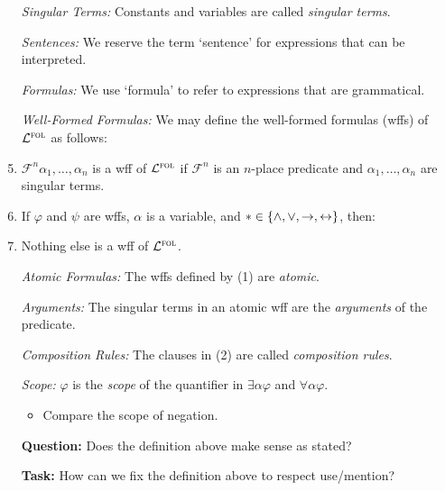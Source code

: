 \documentclass[a4paper, 11pt]{article} %
\begin{document}
\begin{enumerate}
  \item[\it Singular Terms:] Constants and variables are called \textit{singular terms}.
  \item[\it Sentences:] We reserve the term `sentence' for expressions that can be interpreted.
  \item[\it Formulas:] We use `formula' to refer to expressions that are grammatical.
  \item[\it Well-Formed Formulas:] We may define the well-formed formulas (wffs) of $\mathcal{L}^{\textsc{fol}}$ as follows:
  \item $\mathcal{F}^n\alpha_1,\ldots,\alpha_n$ is a wff of $\mathcal{L}^{\textsc{fol}}$ if $\mathcal{F}^n$ is an $n$-place predicate and $\alpha_1,\ldots,\alpha_n$ are singular terms.
  \item If $\varphi$ and $\psi$ are wffs, $\alpha$ is a variable, and $\ast \in \lbrace\wedge, \vee, \rightarrow, \leftrightarrow\rbrace$, then:
    \begin{enumerate}
    \end{enumerate}
  \item Nothing else is a wff of $\mathcal{L}^{\textsc{fol}}$.
  \item[\it Atomic Formulas:] The wffs defined by (1) are \textit{atomic}.
  \item[\it Arguments:] The singular terms in an atomic wff are the \textit{arguments} of the predicate.
  \item[\it Composition Rules:] The clauses in (2) are called \textit{composition rules}.
  \item[\it Scope:] $\varphi$ is the \textit{scope} of the quantifier in $\exists \alpha \varphi$ and $\forall \alpha \varphi$.
    \begin{itemize}
      \item Compare the scope of negation.
    \end{itemize}
  \item[\bf Question:] Does the definition above make sense as stated?
  \item[\bf Task:] How can we fix the definition above to respect use/mention?
\end{enumerate}
\end{document}
